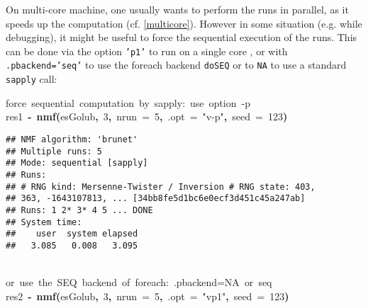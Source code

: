 \documentclass[a4paper]{article}\usepackage{graphicx, color}
\makeatletter
\newcommand{\hlnumber}[1]{\textcolor[rgb]{0,0,0}{#1}}%
\newcommand{\hlfunctioncall}[1]{\textcolor[rgb]{0.501960784313725,0,0.329411764705882}{\textbf{#1}}}%
\newcommand{\hlstring}[1]{\textcolor[rgb]{0.6,0.6,1}{#1}}%
\newcommand{\hlkeyword}[1]{\textcolor[rgb]{0,0,0}{\textbf{#1}}}%
\newcommand{\hlargument}[1]{\textcolor[rgb]{0.690196078431373,0.250980392156863,0.0196078431372549}{#1}}%
\newcommand{\hlcomment}[1]{\textcolor[rgb]{0.180392156862745,0.6,0.341176470588235}{#1}}%
\newcommand{\hlassignement}[1]{\textcolor[rgb]{0,0,0}{\textbf{#1}}}%
\newcommand{\hlsymbol}[1]{\textcolor[rgb]{0,0,0}{#1}}%
\newcommand{\hlstd}[1]{\textcolor[rgb]{0,0,0}{#1}}%
\newenvironment{kframe}{%
 \def\FrameCommand##1{\hskip\@totalleftmargin \hskip-\fboxsep
 \colorbox{shadecolor}{##1}\hskip-\fboxsep
     \hskip-\linewidth \hskip-\@totalleftmargin \hskip\columnwidth}%
 \MakeFramed {\advance\hsize-\width
   \@totalleftmargin\z@ \linewidth\hsize
   \@setminipage}}%
 {\par\unskip\endMakeFramed}
\newenvironment{knitrout}{}{} %
\let\code=\texttt
\makeatother
\begin{document}
On multi-core machine, one usually wants to perform the runs in parallel, as it speeds up the computation (cf. \cref{multicore}).
However in some situation (e.g. while debugging), it might be useful to force the sequential execution of the runs. 
This can be done via the option \code{'p1'} to run on a single core , or with
\code{.pbackend='seq'} to use the foreach backend \code{doSEQ} or to \code{NA} to use a standard \code{sapply} call:

\begin{knitrout}
\color{fgcolor}\begin{kframe}
\begin{flushleft}
\ttfamily\noindent
\hlcomment{\usebox{\hlnormalsizeboxhash}{\ }force{\ }sequential{\ }computation{\ }by{\ }sapply:{\ }use{\ }option{\ }\usebox{\hlnormalsizeboxsinglequote}-p\usebox{\hlnormalsizeboxsinglequote}}\hspace*{\fill}\\
\hlstd{}\hlsymbol{res1}{\ }\hlassignement{\usebox{\hlnormalsizeboxlessthan}-}{\ }\hlfunctioncall{nmf}\hlkeyword{(}\hlsymbol{esGolub}\hlkeyword{,}{\ }\hlnumber{3}\hlkeyword{,}{\ }\hlargument{nrun}{\ }\hlargument{=}{\ }\hlnumber{5}\hlkeyword{,}{\ }\hlargument{.opt}{\ }\hlargument{=}{\ }\hlstring{"{}v-p"{}}\hlkeyword{,}{\ }\hlargument{seed}{\ }\hlargument{=}{\ }\hlnumber{123}\hlkeyword{)}\mbox{}
\normalfont
\end{flushleft}
\begin{verbatim}
## NMF algorithm: 'brunet'
## Multiple runs: 5
## Mode: sequential [sapply]
## Runs:
## # RNG kind: Mersenne-Twister / Inversion # RNG state: 403,
## 363, -1643107813, ... [34bb8fe5d1bc6e0ecf3d451c45a247ab]
## Runs: 1 2* 3* 4 5 ... DONE
## System time:
##    user  system elapsed 
##   3.085   0.008   3.095 
\end{verbatim}
\begin{flushleft}
\ttfamily\noindent
\hspace*{\fill}\\
\hlstd{}\hlcomment{\usebox{\hlnormalsizeboxhash}{\ }or{\ }use{\ }the{\ }SEQ{\ }backend{\ }of{\ }foreach:{\ }.pbackend=NA{\ }or{\ }\usebox{\hlnormalsizeboxsinglequote}seq\usebox{\hlnormalsizeboxsinglequote}}\hspace*{\fill}\\
\hlstd{}\hlsymbol{res2}{\ }\hlassignement{\usebox{\hlnormalsizeboxlessthan}-}{\ }\hlfunctioncall{nmf}\hlkeyword{(}\hlsymbol{esGolub}\hlkeyword{,}{\ }\hlnumber{3}\hlkeyword{,}{\ }\hlargument{nrun}{\ }\hlargument{=}{\ }\hlnumber{5}\hlkeyword{,}{\ }\hlargument{.opt}{\ }\hlargument{=}{\ }\hlstring{"{}vp1"{}}\hlkeyword{,}{\ }\hlargument{seed}{\ }\hlargument{=}{\ }\hlnumber{123}\hlkeyword{)}\mbox{}

\end{flushleft}
\end{kframe}
\end{knitrout}
\end{document}
